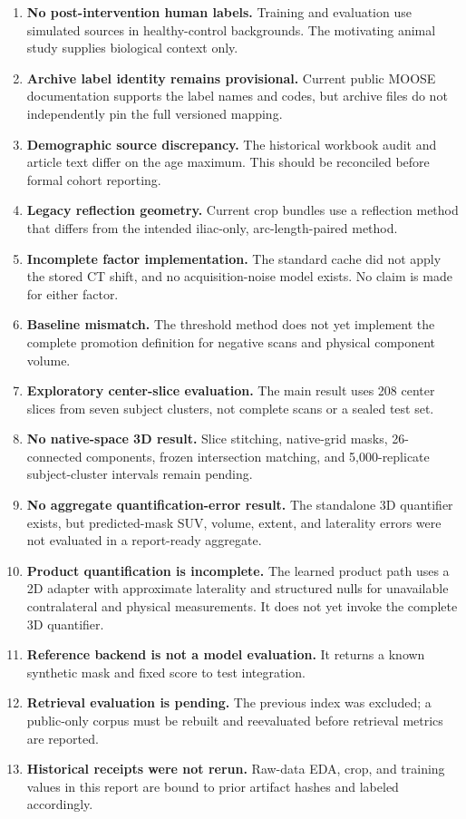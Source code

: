 \documentclass[11pt]{article}
\begin{document}
\begin{enumerate}
  \item \textbf{No post-intervention human labels.} Training and evaluation use simulated sources in healthy-control backgrounds. The motivating animal study supplies biological context only.
  \item \textbf{Archive label identity remains provisional.} Current public MOOSE documentation supports the label names and codes, but archive files do not independently pin the full versioned mapping.
  \item \textbf{Demographic source discrepancy.} The historical workbook audit and article text differ on the age maximum. This should be reconciled before formal cohort reporting.
  \item \textbf{Legacy reflection geometry.} Current crop bundles use a reflection method that differs from the intended iliac-only, arc-length-paired method.
  \item \textbf{Incomplete factor implementation.} The standard cache did not apply the stored CT shift, and no acquisition-noise model exists. No claim is made for either factor.
  \item \textbf{Baseline mismatch.} The threshold method does not yet implement the complete promotion definition for negative scans and physical component volume.
  \item \textbf{Exploratory center-slice evaluation.} The main result uses 208 center slices from seven subject clusters, not complete scans or a sealed test set.
  \item \textbf{No native-space 3D result.} Slice stitching, native-grid masks, 26-connected components, frozen intersection matching, and 5,000-replicate subject-cluster intervals remain pending.
  \item \textbf{No aggregate quantification-error result.} The standalone 3D quantifier exists, but predicted-mask SUV, volume, extent, and laterality errors were not evaluated in a report-ready aggregate.
  \item \textbf{Product quantification is incomplete.} The learned product path uses a 2D adapter with approximate laterality and structured nulls for unavailable contralateral and physical measurements. It does not yet invoke the complete 3D quantifier.
  \item \textbf{Reference backend is not a model evaluation.} It returns a known synthetic mask and fixed score to test integration.
  \item \textbf{Retrieval evaluation is pending.} The previous index was excluded; a public-only corpus must be rebuilt and reevaluated before retrieval metrics are reported.
  \item \textbf{Historical receipts were not rerun.} Raw-data EDA, crop, and training values in this report are bound to prior artifact hashes and labeled accordingly.
\end{enumerate}
\end{document}
